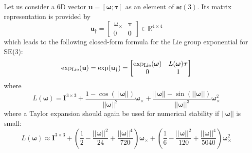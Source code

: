 Let us consider a 6D vector $\mathbf{u}=[\boldsymbol{\omega};\boldsymbol{\tau}]$ as an element of $\mathfrak{se}(3)$. Its matrix representation is provided by
\begin{equation}
  \mathbf{u}_\dagger =
\begin{bmatrix}
\boldsymbol{\omega}_\times & \boldsymbol{\tau} \\
0  & 0
\end{bmatrix} \in \mathbb{R}^{4\times4}
\end{equation}
which leads to the following closed-form formula for the Lie group exponential for SE(3):
\begin{equation}
\operatorname{exp_{Lie}}(\mathbf{u}) = \exp(\mathbf{u}_\dagger) =
\begin{bmatrix}
\operatorname{exp_{Lie}}(\boldsymbol{\omega}) & L(\boldsymbol{\omega})\boldsymbol{\tau} \\
0  & 1
\end{bmatrix}
\end{equation}
where
\begin{equation}
L(\boldsymbol{\omega}) = \mathbf{I}^{3\times3}
+ \frac{1-\cos(||\boldsymbol{\omega}||)}{||\boldsymbol{\omega}||^2}\boldsymbol{\omega}_\times
+ \frac{||\boldsymbol{\omega}||-\sin(||\boldsymbol{\omega}||)}{||\boldsymbol{\omega}||^3}\boldsymbol{\omega}_\times^2
\end{equation}
where a Taylor expansion should again be used for numerical stability if $||\boldsymbol{\omega}||$ is small:
\begin{equation}
L(\boldsymbol{\omega}) \approx \mathbf{I}^{3\times3}
+ (\frac{1}{2}-\frac{||\boldsymbol{\omega}||^2}{24}+\frac{||\boldsymbol{\omega}||^4}{720})\boldsymbol{\omega}_\times
+ (\frac{1}{6}-\frac{||\boldsymbol{\omega}||^2}{120}+\frac{||\boldsymbol{\omega}||^4}{5040})\boldsymbol{\omega}_\times^2
\end{equation}

